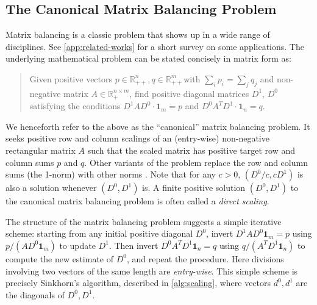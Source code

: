 \subsection{The Canonical Matrix Balancing Problem}
Matrix balancing is a classic problem that shows up in a wide range of disciplines. See \cref{app:related-works} for a short survey on some applications. 
The underlying mathematical problem can be stated concisely in matrix form as:
\begin{quote} 
Given positive vectors $p \in \mathbb{R}_{++}^n,q \in \mathbb{R}_{++}^m$with $\sum_i p_i=\sum_j q_j$ and non-negative matrix $A\in \mathbb{R}_+^{n\times m}$, find positive diagonal matrices 
$D^{1}$, $D^{0}$ satisfying the conditions $D^{1}AD^{0}\cdot\mathbf{1}_m=p$
and $D^{0}A^{T}D^{1}\cdot\mathbf{1}_n=q$.\end{quote}
We henceforth refer to the above as the ``canonical'' matrix balancing problem. It seeks positive row and column scalings of an (entry-wise) non-negative rectangular matrix $A$ such that the scaled matrix has positive target row and column sums $p$ and $q$. Other variants of the problem replace the row and column sums (the 1-norm) with other norms \citep{bauer1963optimally,ruiz2001scaling}. Note that for any $c>0$, $(D^0/c,cD^1)$ 
 is also a solution whenever $(D^0,D^1)$ is. A finite positive solution $(D^{0},D^{1})$ to the canonical matrix balancing problem is often called a \emph{direct scaling}.

 The structure of the matrix balancing problem suggests a simple iterative scheme: starting
from any initial positive diagonal $D^{0}$, invert $D^{1}AD^{0}\mathbf{1}_m = p$ using $p/(AD^{0}\mathbf{1}_m)$
 to update $D^{1}$. Then invert $D^{0}A^{T}D^{1}\mathbf{1}_n=q$ using  $q/(A^{T}D^{1}\mathbf{1}_n)$ to compute the new estimate of $D^{0}$, and repeat the procedure. Here divisions involving two vectors of the same length are \emph{entry-wise}. This simple scheme is precisely Sinkhorn's algorithm, described in \cref{alg:scaling}, where vectors $d^0,d^1$ are the diagonals of $D^0,D^1$.


